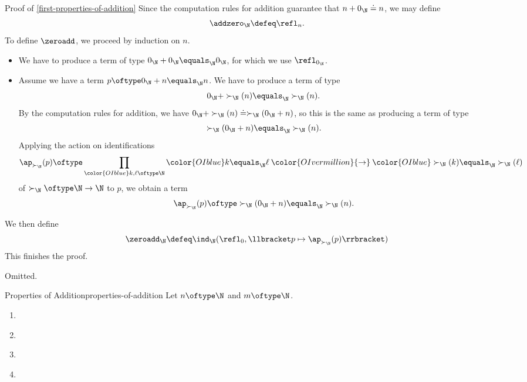 \begin{Proof}{Proof of \cref{first-properties-of-addition}}%
    Since the computation rules for addition guarantee that $n+0_{\N}\doteq n$, we may define
    \[
        \addzero_{\N}%
        \defeq%
        \refl_{n}.%
    \]%
    To define $\zeroadd$, we proceed by induction on $n$.
    \begin{itemize}
        \item{}We have to produce a term of type $0_{\N}+0_{\N}\equals_{\N}0_{\N}$, for which we use $\refl_{0_{\N}}$.
        \item{}Assume we have a term $p\oftype 0_{\N}+n\equals_{\N}n$. We have to produce a term of type
            \[
                0_{\N}+\succ_{\N}(n)%
                \equals_{\N}%
                \succ_{\N}(n).%
            \]%
            By the computation rules for addition, we have $0_{\N}+\succ_{\N}(n)\doteq\succ_{\N}(0_{\N}+n)$, so this is the same as producing a term of type
            \[
                \succ_{\N}(0_{\N}+n)%
                \equals_{\N}%
                \succ_{\N}(n).%
            \]%
            Applying the action on identifications
            \[
                \ap_{\succ_{\N}}(p)%
                \oftype%
                \prod_{{\color{OIblue}k,\ell\oftype\N}}{\color{OIblue}k\equals_{\N}\ell}\mathbin{\color{OIvermillion}{\to}}{\color{OIblue}\succ_{\N}(k)\equals_{\N}\succ_{\N}(\ell)}%
            \]%
            of $\succ_{\N}\oftype\N\to\N$ to $p$, we obtain a term
            \[
                \ap_{\succ_{\N}}(p)%
                \oftype%
                \succ_{\N}(0_{\N}+n)%
                \equals_{\N}%
                \succ_{\N}(n).%
            \]%
    \end{itemize}
    We then define
    \[
        \zeroadd_{\N}%
        \defeq%
        \ind_{\N}(\refl_{0},\llbracket p\mapsto\ap_{\succ_{\N}}(p)\rrbracket)%
    \]%
    This finishes the proof.

    Omitted.
\end{Proof}
\begin{proposition}{Properties of Addition}{properties-of-addition}%
    Let $n\oftype\N$ and $m\oftype\N$.
    \begin{enumerate}
        \item\label{properties-of-addition-unitality}
        \item\label{properties-of-addition-associativity}
        \item\label{properties-of-addition-commutativity}
        \item\label{properties-of-addition-successors-via-addition}
    \end{enumerate}
\end{proposition}
